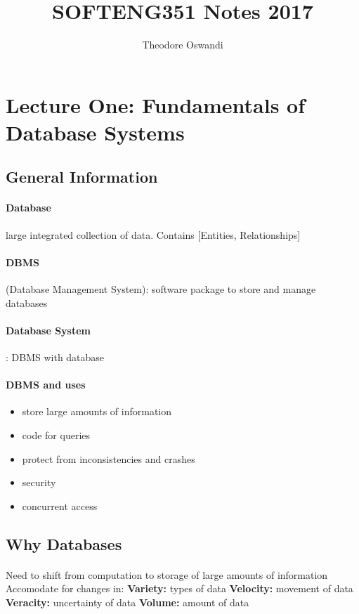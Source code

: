 \documentclass{article}
\title{SOFTENG351 Notes 2017}
\author{Theodore Oswandi}
\newcommand\tab[1][0.5cm]{\hspace*{#1}}
\begin{document}
 \maketitle{} 

\section{Lecture One: Fundamentals of Database Systems}
	\subsection{General Information}
		\paragraph{Database}
		large integrated collection of data. 
		\newline Contains [Entities, Relationships] 

		\paragraph{DBMS}(Database Management System): 
		\newline software package to store and manage databases

		\paragraph{Database System}: DBMS with database

		\paragraph{DBMS and uses}
		\begin{itemize}
			\item store large amounts of information
			\item code for queries
			\item protect from inconsistencies and crashes
			\item security
			\item concurrent access
		\end{itemize}

	\subsection{Why Databases}
		\paragraph{}
		Need to shift from computation to storage of large amounts of information
		\newline \newline Accomodate for changes in:
		\newline \tab \textbf{Variety:} types of data
		\newline \tab \textbf{Velocity:} movement of data
		\newline \tab \textbf{Veracity:} uncertainty of data
		\newline \tab \textbf{Volume:} amount of data
\end{document}
